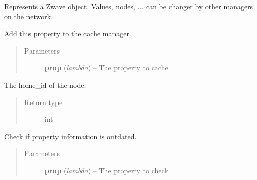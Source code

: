 \documentclass[letterpaper,10pt,english]{sphinxmanual}
\begin{document}
\begin{fulllineitems}
\label{object:openzwave.object.ZWaveObject}
Represents a Zwave object. Values, nodes, ... can be changer by
other managers on the network.

\begin{fulllineitems}
\label{object:openzwave.object.ZWaveObject.cache_property}
Add this property to the cache manager.
\begin{quote}\begin{description}
\item[{Parameters}] \leavevmode
\textbf{prop} (\emph{lambda}) -- The property to cache

\end{description}\end{quote}

\end{fulllineitems}


\begin{fulllineitems}
\label{object:openzwave.object.ZWaveObject.home_id}
The home\_id of the node.
\begin{quote}\begin{description}
\item[{Return type}] \leavevmode
int

\end{description}\end{quote}

\end{fulllineitems}


\begin{fulllineitems}
\label{object:openzwave.object.ZWaveObject.is_outdated}
Check if property information is outdated.
\begin{quote}\begin{description}
\item[{Parameters}] \leavevmode
\textbf{prop} (\emph{lambda}) -- The property to check


\end{description}
\end{quote}
\end{fulllineitems}
\end{fulllineitems}
\end{document}
